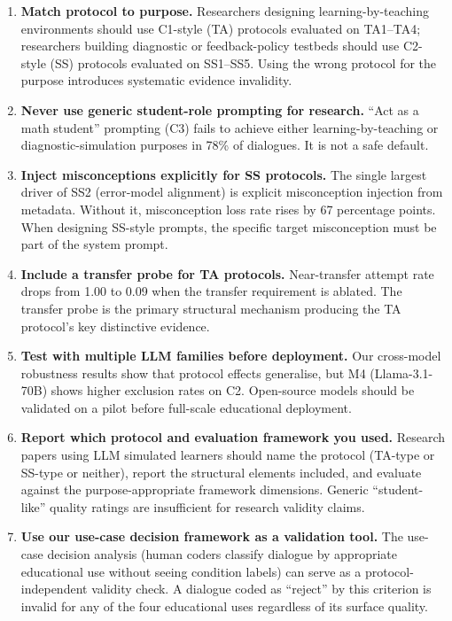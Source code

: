 \documentclass[12pt]{article}
\begin{document}
\begin{enumerate}
    \item \textbf{Match protocol to purpose.} Researchers designing learning-by-teaching
    environments should use C1-style (TA) protocols evaluated on TA1--TA4; researchers
    building diagnostic or feedback-policy testbeds should use C2-style (SS) protocols
    evaluated on SS1--SS5. Using the wrong protocol for the purpose introduces systematic
    evidence invalidity.

    \item \textbf{Never use generic student-role prompting for research.} ``Act as a math
    student'' prompting (C3) fails to achieve either learning-by-teaching or
    diagnostic-simulation purposes in 78\% of dialogues. It is not a safe default.

    \item \textbf{Inject misconceptions explicitly for SS protocols.} The single largest
    driver of SS2 (error-model alignment) is explicit misconception injection from metadata.
    Without it, misconception loss rate rises by 67 percentage points. When designing SS-style
    prompts, the specific target misconception must be part of the system prompt.

    \item \textbf{Include a transfer probe for TA protocols.} Near-transfer attempt rate
    drops from 1.00 to 0.09 when the transfer requirement is ablated. The transfer probe
    is the primary structural mechanism producing the TA protocol's key distinctive evidence.

    \item \textbf{Test with multiple LLM families before deployment.} Our cross-model
    robustness results show that protocol effects generalise, but M4 (Llama-3.1-70B)
    shows higher exclusion rates on C2. Open-source models should be validated on a pilot
    before full-scale educational deployment.

    \item \textbf{Report which protocol and evaluation framework you used.} Research
    papers using LLM simulated learners should name the protocol (TA-type or SS-type or
    neither), report the structural elements included, and evaluate against the
    purpose-appropriate framework dimensions. Generic ``student-like'' quality ratings are
    insufficient for research validity claims.

    \item \textbf{Use our use-case decision framework as a validation tool.} The use-case
    decision analysis (human coders classify dialogue by appropriate educational use without
    seeing condition labels) can serve as a protocol-independent validity check. A dialogue
    coded as ``reject'' by this criterion is invalid for any of the four educational uses
    regardless of its surface quality.
\end{enumerate}
\end{document}
